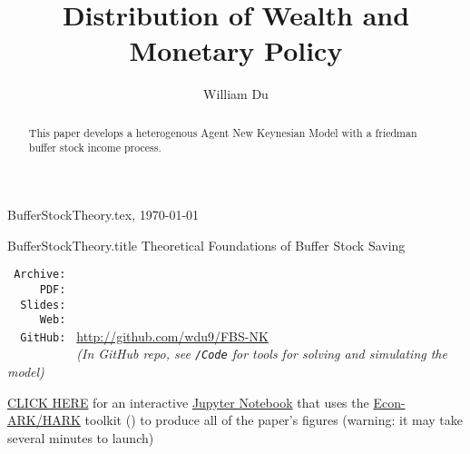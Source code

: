 \documentclass[titlepage]{\econtex}\providecommand{\texname}{BufferStockTheory}
\providecommand{\onlyinsubfile}{}
\providecommand{\notinsubfile}{}
\renewcommand{\onlyinsubfile}[1]{}
\renewcommand{\notinsubfile}[1]{#1}
\begin{document}

\renewcommand{\onlyinsubfile}[1]{}\renewcommand{\notinsubfile}[1]{#1} 

\hfill{\tiny \texname.tex, \today}

\begin{verbatimwrite}{\texname.title}
Theoretical Foundations of Buffer Stock Saving
\end{verbatimwrite}


\title{Distribution of Wealth and Monetary Policy}

\author{William Du\authNum}




\maketitle 


\hypertarget{abstract}{}
\begin{abstract}
  This paper develops a heterogenous Agent New Keynesian Model with a friedman buffer stock income process.
\end{abstract}

\begin{small}
\parbox{\textwidth}{
\begin{center}
\begin{tabbing}
\texttt{~Archive:~} \= \= \url{} \kill \\  %
\texttt{~~~~~PDF:~} \> \> \url{} \\
\texttt{~~Slides:~} \> \> \url{} \\
\texttt{~~~~~Web:~} \> \> \url{}    \\
\texttt{~~GitHub:~} \> \> \url{http://github.com/wdu9/FBS-NK} \\
\texttt{~~~~~~~~~~} \> \> \textit{(In GitHub repo, see \texttt{/Code} for tools for solving and simulating the model)} \\
\end{tabbing}
\end{center}
          
\href{https://colab.research.google.com/github/econ-ark/REMARK/blob/master/REMARKs/BufferStockTheory/BufferStockTheory.ipynb}{CLICK HERE} for an interactive \href{http:https://en.wikipedia.org/wiki/Project_Jupyter}{Jupyter Notebook} that uses the \href{https://econ-ark/HARK}{Econ-ARK/HARK} toolkit (\cite{carroll_et_al-proc-scipy-2018}) to produce all of the paper's figures (warning: it may take several minutes to launch)
}
\end{small}
\end{document}
